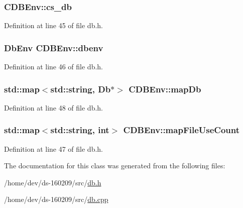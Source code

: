\subsubsection[{cs\+\_\+db}]{ C\+D\+B\+Env\+::cs\+\_\+db\hspace{0.3cm}{\ttfamily [mutable]}}\label{class_c_d_b_env_af71bf28f9142c38aedc550353270b2b7}


Definition at line 45 of file db.\+h.

\hypertarget{class_c_d_b_env_a50a70690e7f688f5e92a972e7fa18668}{}
\subsubsection[{dbenv}]{\setlength{\rightskip}{0pt plus 5cm}Db\+Env C\+D\+B\+Env\+::dbenv}\label{class_c_d_b_env_a50a70690e7f688f5e92a972e7fa18668}


Definition at line 46 of file db.\+h.

\hypertarget{class_c_d_b_env_a89184b6635285b963fa4d80fc292b386}{}
\subsubsection[{map\+Db}]{\setlength{\rightskip}{0pt plus 5cm}std\+::map$<$std\+::string, Db$\ast$$>$ C\+D\+B\+Env\+::map\+Db}\label{class_c_d_b_env_a89184b6635285b963fa4d80fc292b386}


Definition at line 48 of file db.\+h.

\hypertarget{class_c_d_b_env_a3b8a3caf48395ef3f05e3717b33bf32c}{}
\subsubsection[{map\+File\+Use\+Count}]{\setlength{\rightskip}{0pt plus 5cm}std\+::map$<$std\+::string, int$>$ C\+D\+B\+Env\+::map\+File\+Use\+Count}\label{class_c_d_b_env_a3b8a3caf48395ef3f05e3717b33bf32c}


Definition at line 47 of file db.\+h.



The documentation for this class was generated from the following files\+:\begin{DoxyCompactItemize}
\item 
/home/dev/ds-\/160209/src/\hyperlink{db_8h}{db.\+h}\item 
/home/dev/ds-\/160209/src/\hyperlink{db_8cpp}{db.\+cpp}\end{DoxyCompactItemize}
